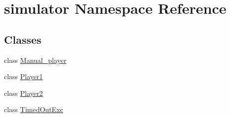 \hypertarget{namespacesimulator}{}\section{simulator Namespace Reference}
\label{namespacesimulator}
\subsection*{Classes}
\begin{DoxyCompactItemize}
\item 
class \hyperlink{classsimulator_1_1_manual__player}{Manual\+\_\+player}
\item 
class \hyperlink{classsimulator_1_1_player1}{Player1}
\item 
class \hyperlink{classsimulator_1_1_player2}{Player2}
\item 
class \hyperlink{classsimulator_1_1_timed_out_exc}{Timed\+Out\+Exc}
\end{DoxyCompactItemize}
